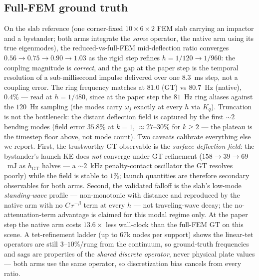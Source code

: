 \subsection{Full-FEM ground truth}
\label{sec:results:fem}
On the slab reference (one corner-fixed $10\times6\times2$ FEM slab carrying an
impactor and a bystander; both arms integrate the \emph{same} operator, the
native arm using its true eigenmodes), the reduced-vs-full-FEM mid-deflection
ratio converges $0.56 \to 0.75 \to 0.90 \to 1.03$ as the rigid step refines
$h = 1/120 \to 1/960$: the coupling magnitude is \emph{correct}, and the gap at
the paper step is the temporal resolution of a sub-millisecond impulse
delivered over one $8.3$~ms step, not a coupling error. The ring frequency
matches at $81.0$ (GT) vs $80.7$~Hz (native), $0.4\%$ --- read at $h=1/480$,
since at the paper step the $81$~Hz ring aliases against the $120$~Hz sampling
(the modes carry $\omega_j$ exactly at every $h$ via $K_q$). Truncation is not
the bottleneck: the distant deflection field is captured by the first
${\sim}2$ bending modes (field error $35.8\%$ at $k{=}1$, ${\approx}27$--$30\%$
for $k\ge2$ --- the plateau is the timestep floor above, not mode count). Two
caveats calibrate everything else we report. First, the trustworthy GT
observable is the \emph{surface deflection field}: the bystander's launch KE
does \emph{not} converge under GT refinement ($158\to39\to69$~mJ as
$h_{\mathrm{GT}}$ halves --- a ${\sim}2$~kHz penalty-contact oscillator the GT
resolves poorly) while the field is stable to $1\%$; launch quantities are
therefore secondary observables for both arms. Second, the validated falloff
is the slab's low-mode \emph{standing-wave} profile --- non-monotonic with
distance and reproduced by the native arm with no $C\,r^{-\beta}$ term at
every $h$ --- not traveling-wave decay; the no-attenuation-term advantage is
claimed for this modal regime only. At the paper step the native arm costs
$13.6\times$ less wall-clock than the full-FEM GT on this scene.
A tet-refinement ladder (up to 67k nodes per support) shows the linear-tet
operators are still $3$--$10\%$/rung from the continuum, so ground-truth
frequencies and sags are properties of the \emph{shared discrete operator},
never physical plate values --- both arms use the same operator, so
discretization bias cancels from every ratio.

